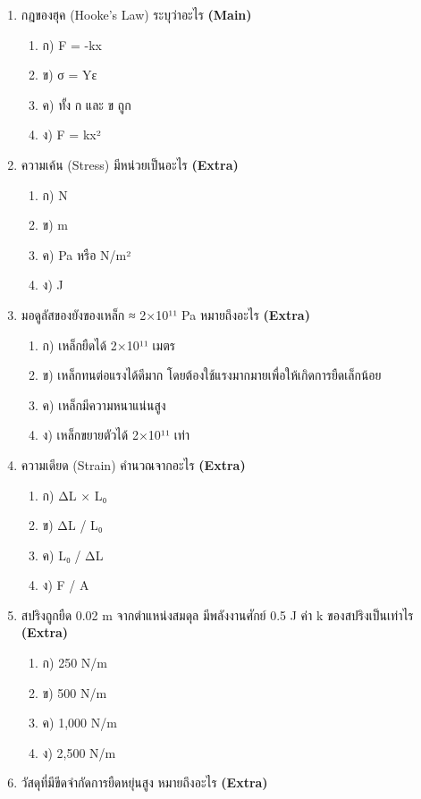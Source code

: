 \documentclass[12pt]{article}
\begin{document}
\begin{enumerate}[label=\arabic*.]
\item กฎของฮุค (Hooke's Law) ระบุว่าอะไร \hfill \textbf{\small (Main)}
\begin{enumerate}[label=)]
\item ก) F = -kx
\item ข) σ = Yε
\item ค) ทั้ง ก และ ข ถูก
\item ง) F = kx²
\end{enumerate}
\item ความเค้น (Stress) มีหน่วยเป็นอะไร \hfill \textbf{\small (Extra)}
\begin{enumerate}[label=)]
\item ก) N
\item ข) m
\item ค) Pa หรือ N/m²
\item ง) J
\end{enumerate}
\item มอดูลัสของยังของเหล็ก ≈ 2×10¹¹ Pa หมายถึงอะไร \hfill \textbf{\small (Extra)}
\begin{enumerate}[label=)]
\item ก) เหล็กยืดได้ 2×10¹¹ เมตร
\item ข) เหล็กทนต่อแรงได้ดีมาก โดยต้องใช้แรงมากมายเพื่อให้เกิดการยืดเล็กน้อย
\item ค) เหล็กมีความหนาแน่นสูง
\item ง) เหล็กขยายตัวได้ 2×10¹¹ เท่า
\end{enumerate}
\item ความเดียด (Strain) คำนวณจากอะไร \hfill \textbf{\small (Extra)}
\begin{enumerate}[label=)]
\item ก) ΔL × L₀
\item ข) ΔL / L₀
\item ค) L₀ / ΔL
\item ง) F / A
\end{enumerate}
\item สปริงถูกยืด 0.02 m จากตำแหน่งสมดุล มีพลังงานศักย์ 0.5 J ค่า k ของสปริงเป็นเท่าไร \hfill \textbf{\small (Extra)}
\begin{enumerate}[label=)]
\item ก) 250 N/m
\item ข) 500 N/m
\item ค) 1,000 N/m
\item ง) 2,500 N/m
\end{enumerate}
\item วัสดุที่มีขีดจำกัดการยืดหยุ่นสูง หมายถึงอะไร \hfill \textbf{\small (Extra)}
\begin{enumerate}[label=)]

\end{enumerate}
\end{enumerate}
\end{document}
